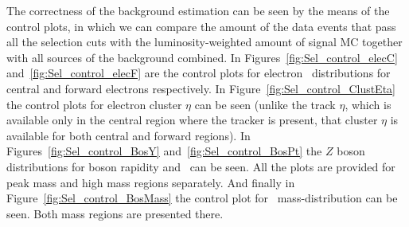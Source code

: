 The correctness of the background estimation can be seen by the means of the control plots, in which we can compare the amount of the data events that pass all the selection cuts with the luminosity-weighted amount of signal MC together with all sources of the background combined. In Figures~\ref{fig:Sel_control_elecC} and~\ref{fig:Sel_control_elecF} are the control plots for electron \pt\ distributions for central and forward electrons respectively. In Figure~\ref{fig:Sel_control_ClustEta} the control plots for electron cluster $\eta$ can be seen (unlike the track $\eta$, which is available only in the central region where the tracker is present, that cluster $\eta$ is available for both central and forward regions). In Figures~\ref{fig:Sel_control_BosY} and~\ref{fig:Sel_control_BosPt} the $Z$ boson distributions for boson rapidity and \pt\ can be seen. All the plots are provided for peak mass and high mass regions separately. And finally in Figure~\ref{fig:Sel_control_BosMass} the control plot for \Zee\ mass-distribution can be seen. Both mass regions are presented there.

\begin{figure}
\end{figure}

